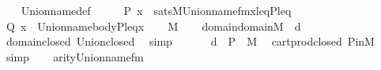 \begin{isabellebody}
%
\isadelimproof
\ \ %
\endisadelimproof
%
\isatagproof
{}\isamarkupfalse%
\ Union{\isacharunderscore}{\kern0pt}name{\isacharunderscore}{\kern0pt}def\isanewline
{}\isamarkupfalse%
\ {\isacharminus}{\kern0pt}\isanewline
\ \ \isamarkupfalse%
\ {\isacharquery}{\kern0pt}P{\isacharequal}{\kern0pt}{\isachardoublequoteopen}{\isasymlambda}\ x\ {\isachardot}{\kern0pt}\ sats{\isacharparenleft}{\kern0pt}M{\isacharcomma}{\kern0pt}Union{\isacharunderscore}{\kern0pt}name{\isacharunderscore}{\kern0pt}fm{\isacharcomma}{\kern0pt}{\isacharbrackleft}{\kern0pt}x{\isacharcomma}{\kern0pt}{\isasymtau}{\isacharcomma}{\kern0pt}leq{\isacharbrackright}{\kern0pt}{\isacharat}{\kern0pt}{\isacharbrackleft}{\kern0pt}P{\isacharcomma}{\kern0pt}{\isasymtau}{\isacharcomma}{\kern0pt}leq{\isacharbrackright}{\kern0pt}{\isacharparenright}{\kern0pt}{\isachardoublequoteclose}\isanewline
\ \ \isamarkupfalse%
\ {\isacharquery}{\kern0pt}Q{\isacharequal}{\kern0pt}{\isachardoublequoteopen}{\isasymlambda}\ x\ {\isachardot}{\kern0pt}\ Union{\isacharunderscore}{\kern0pt}name{\isacharunderscore}{\kern0pt}body{\isacharparenleft}{\kern0pt}P{\isacharcomma}{\kern0pt}leq{\isacharcomma}{\kern0pt}{\isasymtau}{\isacharcomma}{\kern0pt}x{\isacharparenright}{\kern0pt}{\isachardoublequoteclose}\isanewline
\ \ \isamarkupfalse%
\ {\isacartoucheopen}{\isasymtau}{\isasymin}M{\isacartoucheclose}\isanewline
\ \ \isamarkupfalse%
\ {\isachardoublequoteopen}domain{\isacharparenleft}{\kern0pt}{\isasymUnion}{\isacharparenleft}{\kern0pt}domain{\isacharparenleft}{\kern0pt}{\isasymtau}{\isacharparenright}{\kern0pt}{\isacharparenright}{\kern0pt}{\isacharparenright}{\kern0pt}{\isasymin}M{\isachardoublequoteclose}\ {\isacharparenleft}{\kern0pt}\ {\isachardoublequoteopen}{\isacharquery}{\kern0pt}d\ {\isasymin}\ {\isacharunderscore}{\kern0pt}{\isachardoublequoteclose}{\isacharparenright}{\kern0pt}\ \isamarkupfalse%
\ domain{\isacharunderscore}{\kern0pt}closed\ Union{\isacharunderscore}{\kern0pt}closed\ \isamarkupfalse%
\ simp\isanewline
\ \ \isamarkupfalse%
\isanewline
\ \ \isamarkupfalse%
\ {\isachardoublequoteopen}{\isacharquery}{\kern0pt}d\ {\isasymtimes}\ P\ {\isasymin}\ M{\isachardoublequoteclose}\ \isamarkupfalse%
\ cartprod{\isacharunderscore}{\kern0pt}closed\ P{\isacharunderscore}{\kern0pt}in{\isacharunderscore}{\kern0pt}M\ \isamarkupfalse%
\ simp\isanewline
\ \ \isamarkupfalse%
\ {\isachardoublequoteopen}arity{\isacharparenleft}{\kern0pt}Union{\isacharunderscore}{\kern0pt}name{\isacharunderscore}{\kern0pt}fm{\isacharparenright}{\kern0pt}{\isasymle}{}{\isachardoublequoteclose}\ \isamarkupfalse%

\end{isabellebody}
